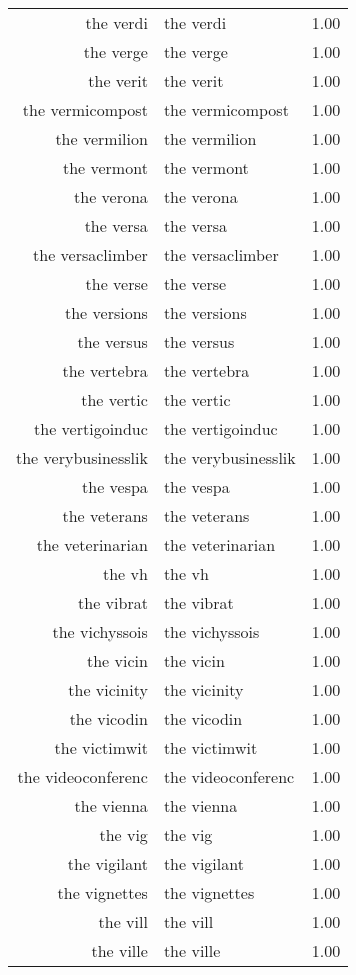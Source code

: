 \begin{table}[ht]
\begin{tabular}{rlr}
  the verdi & the verdi & 1.00 \\ 
  the verge & the verge & 1.00 \\ 
  the verit & the verit & 1.00 \\ 
  the vermicompost & the vermicompost & 1.00 \\ 
  the vermilion & the vermilion & 1.00 \\ 
  the vermont & the vermont & 1.00 \\ 
  the verona & the verona & 1.00 \\ 
  the versa & the versa & 1.00 \\ 
  the versaclimber & the versaclimber & 1.00 \\ 
  the verse & the verse & 1.00 \\ 
  the versions & the versions & 1.00 \\ 
  the versus & the versus & 1.00 \\ 
  the vertebra & the vertebra & 1.00 \\ 
  the vertic & the vertic & 1.00 \\ 
  the vertigoinduc & the vertigoinduc & 1.00 \\ 
  the verybusinesslik & the verybusinesslik & 1.00 \\ 
  the vespa & the vespa & 1.00 \\ 
  the veterans & the veterans & 1.00 \\ 
  the veterinarian & the veterinarian & 1.00 \\ 
  the vh & the vh & 1.00 \\ 
  the vibrat & the vibrat & 1.00 \\ 
  the vichyssois & the vichyssois & 1.00 \\ 
  the vicin & the vicin & 1.00 \\ 
  the vicinity & the vicinity & 1.00 \\ 
  the vicodin & the vicodin & 1.00 \\ 
  the victimwit & the victimwit & 1.00 \\ 
  the videoconferenc & the videoconferenc & 1.00 \\ 
  the vienna & the vienna & 1.00 \\ 
  the vig & the vig & 1.00 \\ 
  the vigilant & the vigilant & 1.00 \\ 
  the vignettes & the vignettes & 1.00 \\ 
  the vill & the vill & 1.00 \\ 
  the ville & the ville & 1.00 \\ 

\end{tabular}
\end{table}
